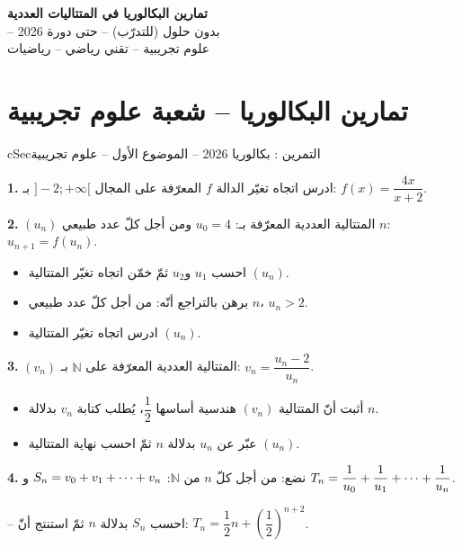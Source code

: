\documentclass[12pt,a4paper]{article}
\newenvironment{BOX}[2]{\begin{otherlanguage}{english}\begin{arbox}{#1}{#2}}{\end{arbox}\end{otherlanguage}}
\newcounter{exo}
\newenvironment{tamrin}[1]{\stepcounter{exo}\begin{BOX}{cSec}{التمرين \theexo: #1}}{\end{BOX}}
\newenvironment{LTR}{\begin{otherlanguage}{english}}{\end{otherlanguage}}
\renewcommand{\cdots}{\mathinner{\cdotp\cdotp\cdotp}}
\newcommand{\N}{\mathbb{N}}
\newenvironment{sq}{\begin{itemize}[leftmargin=2.4em,itemsep=3pt]}{\end{itemize}}
\newcommand{\qa}{\item[(أ)]}\newcommand{\qb}{\item[(ب)]}\newcommand{\qc}{\item[(جـ)]}\newcommand{\qd}{\item[(د)]}\newcommand{\qe}{\item[(هـ)]}
\newcommand{\QQ}[1]{\par\smallskip\textbf{#1.} }
\begin{document}
\begin{LTR}
\begin{tcolorbox}[enhanced,colback=cSec,colframe=cSec,arc=3mm,halign=center,boxrule=0pt,top=12pt,bottom=12pt,before upper={\selectlanguage{arabic}}]
{\color{white}\fontsize{26}{32}\selectfont\bfseries تمارين البكالوريا في المتتاليات العددية}\\[8pt]
{\color{white}\large -- بدون حلول (للتدرّب) -- حتى دورة 2026}\\[5pt]
{\color{white}\large علوم تجريبية -- تقني رياضي -- رياضيات}
\end{tcolorbox}
\end{LTR}
\section{تمارين البكالوريا -- شعبة علوم تجريبية}
\begin{tamrin}{بكالوريا 2026 -- الموضوع الأول -- علوم تجريبية}
\QQ{1} ادرس اتجاه تغيّر الدالة $f$ المعرّفة على المجال $]-2;+\infty[$ بـ: $f(x)=\dfrac{4x}{x+2}$.

\QQ{2} $(u_n)$ المتتالية العددية المعرّفة بـ: $u_0=4$ ومن أجل كلّ عدد طبيعي $n$: $u_{n+1}=f(u_n)$.
\begin{sq}
\qa احسب $u_1$ و$u_2$ ثمّ خمّن اتجاه تغيّر المتتالية $(u_n)$.
\qb برهن بالتراجع أنّه: من أجل كلّ عدد طبيعي $n$، $u_n>2$.
\qc ادرس اتجاه تغيّر المتتالية $(u_n)$.
\end{sq}

\QQ{3} $(v_n)$ المتتالية العددية المعرّفة على $\N$ بـ: $v_n=\dfrac{u_n-2}{u_n}$.
\begin{sq}
\qa أثبت أنّ المتتالية $(v_n)$ هندسية أساسها $\dfrac12$، يُطلب كتابة $v_n$ بدلالة $n$.
\qb عبّر عن $u_n$ بدلالة $n$ ثمّ احسب نهاية المتتالية $(u_n)$.
\end{sq}

\QQ{4} نضع: من أجل كلّ $n$ من $\N$: $S_n=v_0+v_1+\cdots+v_n$ و $T_n=\dfrac{1}{u_0}+\dfrac{1}{u_1}+\cdots+\dfrac{1}{u_n}$.

-- احسب $S_n$ بدلالة $n$ ثمّ استنتج أنّ: $T_n=\dfrac12 n+\left(\dfrac12\right)^{n+2}$.
\end{tamrin}
\end{document}
